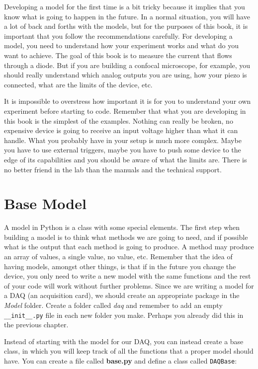Developing a model for the first time is a bit tricky because it implies
that you know what is going to happen in the future. In a normal
situation, you will have a lot of back and forths with the models, but
for the purposes of this book, it is important that you follow the
recommendations carefully. For developing a model, you need to
understand how your experiment works and what do you want to achieve.
The goal of this book is to measure the current that flows through a
diode. But if you are building a confocal microscope, for example, you
should really understand which analog outputs you are using, how your
piezo is connected, what are the limits of the device, etc.

It is impossible to overstress how important it is for you to understand
your own experiment before starting to code. Remember that what you are
developing in this book is the simplest of the examples. Nothing can
really be broken, no expensive device is going to receive an input
voltage higher than what it can handle. What you probably have in your
setup is much more complex. Maybe you have to use external triggers,
maybe you have to push some device to the edge of its capabilities and
you should be aware of what the limits are. There is no better friend in
the lab than the manuals and the technical support.

\section{Base Model}\label{basemodel}
A model in Python is a class with some special elements. The first step
when building a model is to think what methods we are going to need, and
if possible what is the output that each method is going to produce. A
method may produce an array of values, a single value, no value, etc.
Remember that the idea of having models, amongst other things, is that
if in the future you change the device, you only need to write a new
model with the same functions and the rest of your code will work
without further problems. Since we are writing a model for a {DAQ} (an
acquisition card), we should create an appropriate package in the
\emph{Model} folder. Create a folder called \emph{daq} and remember to
add an empty \texttt{__init__.py} file in each new folder you make.
Perhaps you already did this in the previous chapter.

Instead of starting with the model for our {DAQ}, you can instead create
a base class, in which you will keep track of all the functions that a proper model should have. You can create a file called \textbf{base.py}
and define a class called \texttt{DAQBase}:


